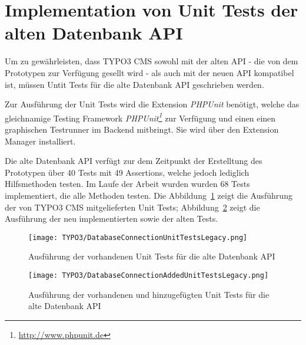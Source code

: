 \section{Implementation von Unit Tests der alten Datenbank API}
\label{prototype:sec:createTestForOldAPI}
Um zu gewährleisten, dass TYPO3 CMS sowohl mit der alten API - die von dem Prototypen zur Verfügung gesellt wird - als auch mit der neuen API kompatibel ist, müssen Untit Tests für die alte Datenbank API geschrieben werden. 

Zur Ausführung der Unit Tests wird die Extension \textit{PHPUnit} benötigt, welche das gleichnamige Testing Framework \textit{PHPUnit\footnote{\url{http://www.phpunit.de}}} zur Verfügung und einen einen graphischen Testrunner im Backend mitbringt. Sie wird über den Extension Manager installiert.

Die alte Datenbank API verfügt zur dem Zeitpunkt der Erstelltung des Prototypen über 40 Tests mit 49 Assertions, welche jedoch lediglich Hilfsmethoden testen. Im Laufe der Arbeit wurden wurden 68 Tests implementiert, die alle Methoden testen. Die Abbildung~\ref{fig:executeUnitTestsForOldAPI} zeigt die Ausführung der von TYPO3 CMS mitgelieferten Unit Tests; Abbildung~\ref{fig:executeNewUnitTestsForOldAPI} zeigt die Ausführung der neu implementierten sowie der alten Tests.

\begin{figure}[H]
    \centering
    \texttt{[image: TYPO3/DatabaseConnectionUnitTestsLegacy.png]}
    \caption{Ausführung der vorhandenen Unit Tests für die alte Datenbank API}
    \label{fig:executeUnitTestsForOldAPI}
\end{figure}

\begin{figure}[H]
    \centering
    \texttt{[image: TYPO3/DatabaseConnectionAddedUnitTestsLegacy.png]}
    \caption{Ausführung der vorhandenen und hinzugefügten Unit Tests für die alte Datenbank API}
    \label{fig:executeNewUnitTestsForOldAPI}
\end{figure}
